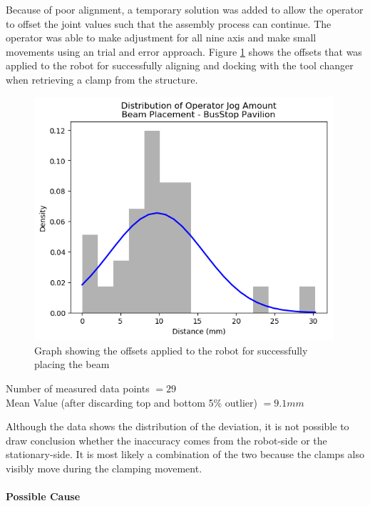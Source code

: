 Because of poor alignment, a temporary solution was added to allow the operator to offset the joint values such that the assembly process can continue. The operator was able to make adjustment for all nine axis and make small movements using an trial and error approach. Figure \ref{fig:offsets-applied-manually} shows the offsets that was applied to the robot for successfully aligning and docking with the tool changer when retrieving a clamp from the structure.

\begin{figure}[!h]
    \centering
    \includegraphics[width=0.99\textwidth]{images/6b/img07.png}
    \caption{Graph showing the offsets applied to the robot for successfully placing the beam}
    \label{fig:offsets-applied-manually}
\end{figure}


{\footnotesize Number of measured data points $= 29$ \\ Mean Value (after discarding top and bottom 5\% outlier) $= 9.1mm$}

Although the data shows the distribution of the deviation, it is not possible to draw conclusion whether the inaccuracy comes from the robot-side or the stationary-side. It is most likely a combination of the two because the clamps also visibly move during the clamping movement. 

\FloatBarrier

\paragraph{Possible Cause}

